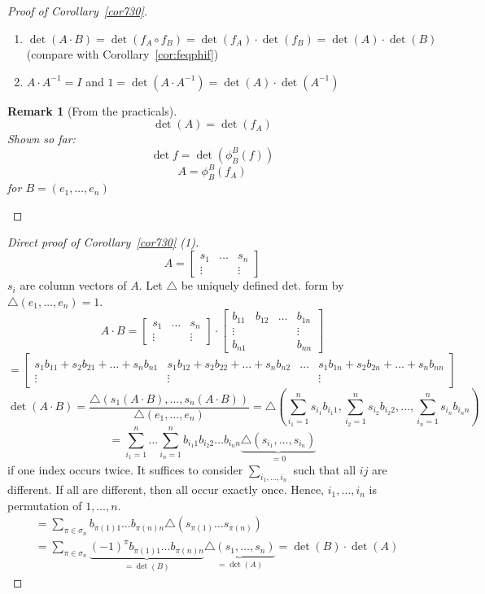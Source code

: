 \documentclass[a4paper]{article}
\numberwithin{lecref}{section}
\newtheorem*{Remark}{Remark}
\begin{document}
\begin{proof}[Proof of Corollary~\ref{cor730}]
  \begin{enumerate}
    \item $\det(A \cdot B) = \det(f_A \circ f_B) = \det(f_A) \cdot \det(f_B) = \det(A) \cdot \det(B)$ (compare with Corollary~\ref{cor:feqphif})
    \item $A \cdot A^{-1} = I$ and $1 = \det(A \cdot A^{-1}) = \det(A) \cdot \det(A^{-1})$
  \end{enumerate}
  \begin{Remark}[From the practicals]
    \[ \det(A) = \det(f_A) \]
    Shown so far:
    \[ \det{f} = \det\left(\phi_B^B(f)\right) \]
    \[ A = \phi_B^B\left(f_A\right) \]
    for $B = (e_1, \dots, e_n)$
  \end{Remark}
\end{proof}

\begin{proof}[Direct proof of Corollary~\ref{cor730} (1)]
  \[ A = \begin{bmatrix} s_1 & \dots & s_n \\ \vdots &  & \vdots \end{bmatrix} \]
  $s_i$ are column vectors of $A$.
  Let $\triangle$ be uniquely defined det. form by $\triangle(e_1, \dots, e_n) = 1$.
  \[
    A \cdot B
    = \begin{bmatrix} s_1 & \dots & s_n \\ \vdots &  & \vdots \end{bmatrix} \cdot \begin{bmatrix} b_{11} & b_{12} & \dots & b_{1n} \\ \vdots & & & \vdots \\ b_{n1} & & & b_{nn} \end{bmatrix}
  \] \[
    = \begin{bmatrix} s_1 b_{11} + s_2 b_{21} + \dots + s_n b_{n1} & s_1 b_{12} + s_2 b_{22} + \dots + s_n b_{n2} & \dots & s_1 b_{1n} + s_2 b_{2n} + \dots + s_n b_{nn} \\
    \vdots & \vdots &  & \vdots \end{bmatrix}
  \] \[
    \det(A \cdot B) = \frac{\triangle(s_1(A \cdot B), \dots, s_n(A \cdot B))}{\triangle (e_1, \dots, e_n)}
      = \triangle\left(\sum_{i_1=1}^n s_{i_1} b_{i_1 1}, \sum_{i_2=1}^n s_{i_2} b_{i_2 2}, \dots, \sum_{i_n=1}^n s_{i_n} b_{i_n n}\right)
  \] \[
    = \sum_{i_1=1}^n \dots \sum_{i_n=1}^n b_{i_1 1} b_{i_2 2} \dots b_{i_n n} \underbrace{\triangle(s_{i_1}, \dots, s_{i_n})}_{=0}
  \]
  if one index occurs twice. It suffices to consider $\sum_{i_1,\dots,i_n}$ such that all $ij$ are different.
  If all are different, then all occur exactly once. Hence,
  $i_1,\dots,i_n$ is permutation of $1, \dots, n$.
  \begin{align*}
    &= \sum_{\pi \in \sigma_n} b_{\pi(1) 1} \dots b_{\pi(n) n} \triangle(s_{\pi(1)} \dots s_{\pi(n)}) \\
    &= \sum_{\pi \in \sigma_n} \underbrace{(-1)^\pi b_{\pi(1) 1} \dots b_{\pi(n) n}}_{= \det(B)} \underbrace{\triangle(s_1, \dots, s_n)}_{= \det(A)} = \det(B) \cdot \det(A)
  \end{align*}
\end{proof}
\end{document}
